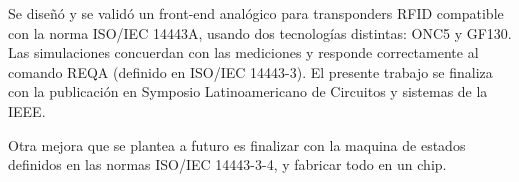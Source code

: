 Se diseñó y se validó un front-end analógico para transponders RFID compatible con la norma ISO/IEC 14443A, usando dos tecnologías distintas: ONC5 y GF130. Las simulaciones concuerdan con las mediciones y responde correctamente al comando REQA (definido en ISO/IEC 14443-3). El presente trabajo \cite{lascas_rfid} se finaliza con la publicación en Symposio Latinoamericano de Circuitos y sistemas de la IEEE.

Otra mejora que se plantea a futuro es finalizar con la maquina de estados definidos en las normas ISO/IEC 14443-3-4, y fabricar todo en un chip. 
